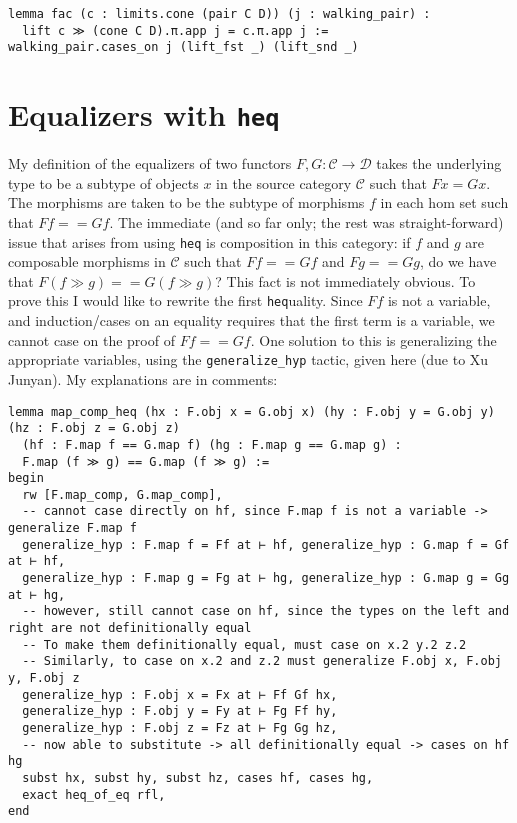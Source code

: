 \documentclass{article}
\newcommand{\CC}{\mathcal{C}}
\newcommand{\DD}{\mathcal{D}}
\newcommand{\<}{\langle}
\renewcommand{\>}{\rangle}
\theoremstyle{definitionstyle}
\theoremstyle{exercisestyle}
\theoremstyle{remarkstyle}
\begin{document}
\begin{lstlisting}
lemma fac (c : limits.cone (pair C D)) (j : walking_pair) :
  lift c ≫ (cone C D).π.app j = c.π.app j :=
walking_pair.cases_on j (lift_fst _) (lift_snd _)\end{lstlisting}

\section{Equalizers with \texttt{heq}}

My definition of the equalizers of two functors
$F, G : \CC \to \DD$ takes the underlying type to be a
subtype of objects $x$ in the source category $\CC$ such that $F x = G x$.
The morphisms are taken to be the subtype of morphisms $f$ in
each hom set such that $F f == G f$.
The immediate (and so far only; the rest was straight-forward)
issue that arises from using \texttt{heq} is composition in this category:
if $f$ and $g$ are composable morphisms in $\CC$ such that
$F f == G f$ and $F g == G g$, do we have that $F (f \gg g) == G (f \gg g)$?
This fact is not immediately obvious.
To prove this I would like to rewrite the first \texttt{heq}uality.
Since $F f$ is not a variable,
and induction/cases on an equality requires that the first term is a variable,
we cannot case on the proof of $F f == G f$.
One solution to this is generalizing the appropriate variables,
using the \texttt{generalize\_hyp} tactic, given here (due to Xu Junyan).
My explanations are in comments:

\begin{lstlisting}
lemma map_comp_heq (hx : F.obj x = G.obj x) (hy : F.obj y = G.obj y) (hz : F.obj z = G.obj z)
  (hf : F.map f == G.map f) (hg : F.map g == G.map g) :
  F.map (f ≫ g) == G.map (f ≫ g) :=
begin
  rw [F.map_comp, G.map_comp],
  -- cannot case directly on hf, since F.map f is not a variable -> generalize F.map f
  generalize_hyp : F.map f = Ff at ⊢ hf, generalize_hyp : G.map f = Gf at ⊢ hf,
  generalize_hyp : F.map g = Fg at ⊢ hg, generalize_hyp : G.map g = Gg at ⊢ hg,
  -- however, still cannot case on hf, since the types on the left and right are not definitionally equal
  -- To make them definitionally equal, must case on x.2 y.2 z.2
  -- Similarly, to case on x.2 and z.2 must generalize F.obj x, F.obj y, F.obj z
  generalize_hyp : F.obj x = Fx at ⊢ Ff Gf hx,
  generalize_hyp : F.obj y = Fy at ⊢ Fg Ff hy,
  generalize_hyp : F.obj z = Fz at ⊢ Fg Gg hz,
  -- now able to substitute -> all definitionally equal -> cases on hf hg
  subst hx, subst hy, subst hz, cases hf, cases hg,
  exact heq_of_eq rfl,
end \end{lstlisting}
\end{document}
